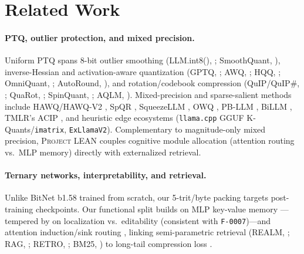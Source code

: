 \documentclass[10pt]{article} %
\newcommand{\lean}{\textsc{Project LEAN}}
\begin{document}
\section{Related Work}
\label{sec:related}

\paragraph{PTQ, outlier protection, and mixed precision.}
Uniform PTQ spans 8-bit outlier smoothing (LLM.int8(), \citealp{dettmers2022llmint8}; SmoothQuant, \citealp{xiao2023smoothquant}), inverse-Hessian and activation-aware quantization (GPTQ, \citealp{frantar2023gptq}; AWQ, \citealp{lin2024awq}; HQQ, \citealp{badri2023hqq}; OmniQuant, \citealp{shao2024omniquant}; AutoRound, \citealp{cheng2024autoround}), and rotation/codebook compression (QuIP/QuIP\#, \citealp{chee2023quip,tseng2024quipsharp}; QuaRot, \citealp{ashkboos2024quarot}; SpinQuant, \citealp{liu2025spinquant}; AQLM, \citealp{egiazarian2024aqlm}). Mixed-precision and sparse-salient methods include HAWQ/HAWQ-V2 \citep{dong2019hawq,dong2020hawqv2}, SpQR \citep{dettmers2024spqr}, SqueezeLLM \citep{kim2024squeezellm}, OWQ \citep{lee2024owq}, PB-LLM \citep{shang2024pbllm}, BiLLM \citep{huang2024billm}, TMLR's ACIP \citep{genzel2025acip}, and heuristic edge ecosystems (\texttt{llama.cpp} GGUF K-Quants/\texttt{imatrix}, \texttt{ExLlamaV2}). Complementary to magnitude-only mixed precision, \lean{} couples cognitive module allocation (attention routing vs.\ MLP memory) directly with externalized retrieval.

\paragraph{Ternary networks, interpretability, and retrieval.}
Unlike BitNet b1.58 \citep{ma2024bitnet} trained from scratch, our 5-trit/byte packing targets post-training checkpoints. Our functional split builds on MLP key-value memory \citep{geva2021transformer,meng2022locating}---tempered by \citet{hase2023localization} on localization vs.\ editability (consistent with \texttt{F-0007})---and attention induction/sink routing \citep{olsson2022incontext,xiao2024streamllm}, linking semi-parametric retrieval (REALM, \citealp{guu2020realm}; RAG, \citealp{lewis2020rag}; RETRO, \citealp{borgeaud2022retro}; BM25, \citealp{robertson2009bm25}) to long-tail compression loss \citep{kandpal2023large,jaiswal2024compressing}.
\end{document}
